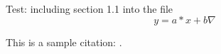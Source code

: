 ~\\
Test: including section 1.1 into the file
\newline
\begin{equation}
y = a*x + b
\nabla 
\end{equation}

This is a sample citation: \cite{schwartz_overview_2012}.